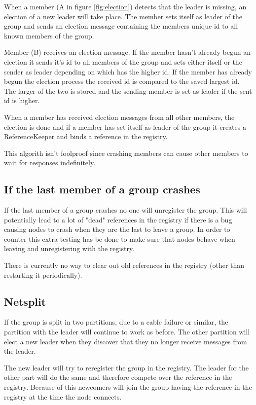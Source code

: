 \documentclass[a4paper,english]{article}
\begin{document}
When a member (A in figure \ref{fig:election}) detects that the leader is missing, an election of a new leader will take place. The member sets itself as leader of the group and sends an election message containing the members unique id to all known members of the group.

Member (B) receives an election message. If the member hasn't already begun an election it sends it's id to all members of the group and sets either itself or the sender as leader depending on which has the higher id.
If the member has already begun the election process the received id is compared to the saved largest id. The larger of the two is stored and the sending member is set as leader if the sent id is higher.

When a member has received election messages from all other members, the election is done and if a member has set itself as leader of the group it creates a ReferenceKeeper and binds a reference in the registry.

This algorith isn't foolproof since crashing members can cause other members to wait for responses indefinitely.

\subsection{If the last member of a group crashes}
If the last member of a group crashes no one will unregister the group.
This will potentially lead to a lot of "dead" references in the registry if there is a bug causing nodes to crash when they are the last to leave a group. In order to counter this extra testing has be done to make sure that nodes behave when leaving and unregistering with the registry.

There is currently no way to clear out old references in the registry (other than restarting it periodically).

\subsection{Netsplit}
If the group is split in two partitions, due to a cable failure or similar, the partition with the leader will continue to work as before. The other partition will elect a new leader when they discover that they no longer receive messages from the leader.

The new leader will try to reregister the group in the registry. The leader for the other part will do the same and therefore compete over the reference in the registry. Because of this newcomers will join the group having the reference in the registry at the time the node connects.
\end{document}
